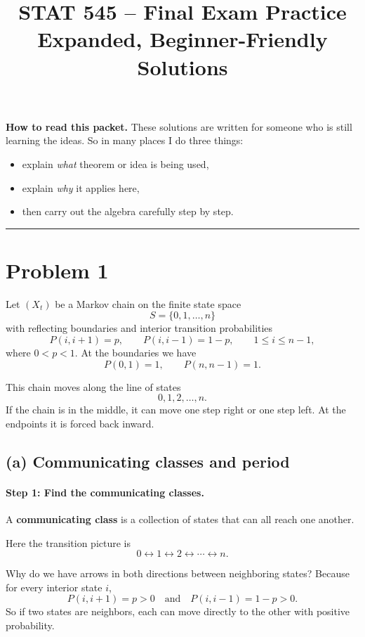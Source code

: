 \documentclass[11pt]{article}
\title{STAT 545 -- Final Exam Practice \\ Expanded, Beginner-Friendly Solutions}
\date{}
\begin{document}
\maketitle

\noindent
\textbf{How to read this packet.}  
These solutions are written for someone who is still learning the ideas.  
So in many places I do three things:
\begin{itemize}[leftmargin=1.5em]
    \item explain \emph{what} theorem or idea is being used,
    \item explain \emph{why} it applies here,
    \item then carry out the algebra carefully step by step.
\end{itemize}

\hrule
\vspace{1em}

\section*{Problem 1}

Let $(X_t)$ be a Markov chain on the finite state space
\[
S=\{0,1,\dots,n\}
\]
with reflecting boundaries and interior transition probabilities
\[
P(i,i+1)=p, \qquad P(i,i-1)=1-p, \qquad 1\le i\le n-1,
\]
where $0<p<1$. At the boundaries we have
\[
P(0,1)=1, \qquad P(n,n-1)=1.
\]

\bigskip

This chain moves along the line of states
\[
0,1,2,\dots,n.
\]
If the chain is in the middle, it can move one step right or one step left.
At the endpoints it is forced back inward.

\subsection*{(a) Communicating classes and period}

\paragraph{Step 1: Find the communicating classes.}

A \textbf{communicating class} is a collection of states that can all reach one another.

Here the transition picture is
\[
0 \leftrightarrow 1 \leftrightarrow 2 \leftrightarrow \cdots \leftrightarrow n.
\]

Why do we have arrows in both directions between neighboring states?
Because for every interior state $i$,
\[
P(i,i+1)=p>0
\quad \text{and} \quad
P(i,i-1)=1-p>0.
\]
So if two states are neighbors, each can move directly to the other with positive probability.
\end{document}
